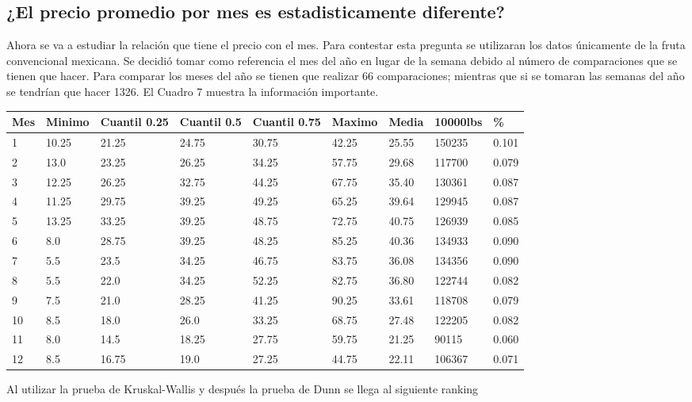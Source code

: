 \documentclass{article}
\begin{document}
\subsection*{¿El precio promedio por mes es estadisticamente diferente? }
Ahora se va a estudiar la relación que tiene el precio con el mes. Para contestar esta pregunta se utilizaran los datos únicamente de la fruta convencional mexicana. Se decidió tomar como referencia el mes del año en lugar de la semana debido al número de comparaciones que se tienen que hacer. Para comparar los meses del año se tienen que realizar 66 comparaciones; mientras que si se tomaran  las semanas del año se tendrían que hacer 1326. El Cuadro 7 muestra la información importante. 
\begin{center}
\begin{tabular}{|l|l|l|l|l|l|l|l|l|}
\hline
		Mes & Minimo & Cuantil 0.25 & Cuantil 0.5 & Cuantil 0.75 & Maximo & Media & 10000lbs & \% \\ \hline
1 & 10.25 & 21.25 & 24.75 & 30.75 & 42.25 & 25.55 & 150235&0.101\\ \hline
 2 & 13.0 & 23.25 & 26.25 & 34.25 & 57.75 & 29.68&117700& 0.079\\ \hline
 3 & 12.25 & 26.25 & 32.75 & 44.25 & 67.75 & 35.40&130361&0.087\\ \hline
 4 & 11.25 & 29.75 & 39.25 & 49.25 & 65.25 & 39.64&129945&0.087\\ \hline
 5 & 13.25 & 33.25 & 39.25 & 48.75 & 72.75 & 40.75&126939&0.085\\ \hline
 6 & 8.0 & 28.75 & 39.25 & 48.25 & 85.25 & 40.36&134933&0.090\\ \hline
 7 & 5.5 & 23.5 & 34.25 & 46.75 & 83.75 & 36.08&134356&0.090\\ \hline
 8 & 5.5 & 22.0 & 34.25 & 52.25 & 82.75 & 36.80&122744&0.082\\ \hline
 9 & 7.5 & 21.0 & 28.25 & 41.25 & 90.25 & 33.61&118708&0.079\\ \hline
 10 & 8.5 & 18.0 & 26.0 & 33.25 & 68.75 & 27.48&122205&0.082\\ \hline
 11 & 8.0 & 14.5 & 18.25 & 27.75 & 59.75 & 21.25&90115&0.060\\ \hline
 12 & 8.5 & 16.75 & 19.0 & 27.25 & 44.75 & 22.11&106367&0.071\\ \hline
\end{tabular}
\end{center}
Al utilizar la prueba de Kruskal-Wallis y después la prueba de Dunn se llega al siguiente ranking 
\end{document}
